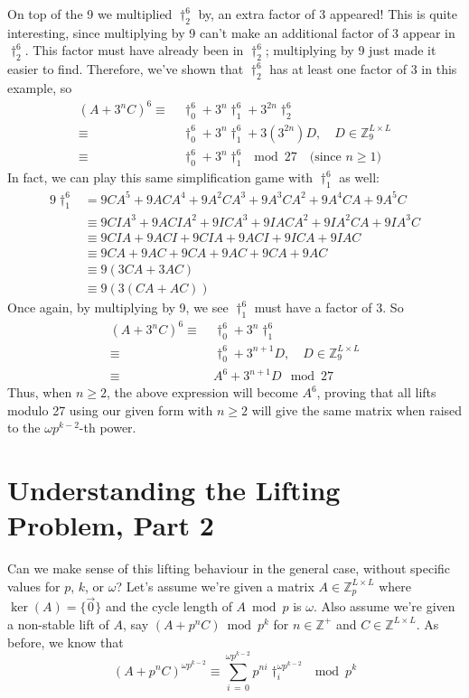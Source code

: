 \documentclass[a4paper, 12pt, reqno]{amsart}
\begin{document}
		On top of the 9 we multiplied $\dag_2^6$ by, an extra factor of 3 appeared! This is quite interesting, since multiplying by 9 can't make an additional factor of 3
		appear in $\dag_2^6$. This factor must have already been in $\dag_2^6$; multiplying by 9 just made it easier to find. Therefore, we've shown that $\dag_2^6$ has at
		least one factor of 3 in this example, so
		\begin{align*}
			(A + 3^nC)^6 \equiv & \ \dag_0^6 + 3^n\dag_1^6 + 3^{2n}\dag_2^6                                   \\
			             \equiv & \ \dag_0^6 + 3^n\dag_1^6 + 3(3^{2n})D,\quad D \in \mathds{Z}_9^{L \times L} \\
						 \equiv & \ \dag_0^6 + 3^n\dag_1^6 \mod{27} \quad \text{(since } n \geq 1)
		\end{align*}
		In fact, we can play this same simplification game with $\dag_1^6$ as well:
		\begin{align*}
			9\dag_1^6 &      = 9CA^5  + 9ACA^4  + 9A^2CA^3 + 9A^3CA^2 + 9A^4CA  + 9A^5C  \\
			          & \equiv 9CIA^3 + 9ACIA^2 + 9ICA^3   + 9IACA^2  + 9IA^2CA + 9IA^3C \\
					  & \equiv 9CIA   + 9ACI    + 9CIA     + 9ACI     + 9ICA    + 9IAC   \\
					  & \equiv 9CA    + 9AC     + 9CA      + 9AC      + 9CA     + 9AC    \\
					  & \equiv 9(3CA + 3AC)                                              \\
					  & \equiv 9(3(CA + AC))
		\end{align*}
		Once again, by multiplying by 9, we see $\dag_1^6$ must have a factor of 3. So
		\begin{align*}
			(A + 3^nC)^6 \equiv & \ \dag_0^6 + 3^n\dag_1^6                                    \\
			             \equiv & \ \dag_0^6 + 3^{n+1}D,\quad D \in \mathds{Z}_9^{L \times L} \\
						 \equiv & \ A^6 + 3^{n+1}D \mod{27}
		\end{align*}
		Thus, when $n \geq 2$, the above expression will become $A^6$, proving that all lifts modulo 27 using our given form with $n \geq 2$ will give the same matrix when 
		raised to the $\omega p^{k-2}$-th power.

	\section{Understanding the Lifting Problem, Part 2}
		\label{sec:understanding2}
		Can we make sense of this lifting behaviour in the general case, without specific values for $p$, $k$, or $\omega$? Let's assume we're given a matrix 
		$A \in \mathds{Z}_p^{L \times L}$ where $\ker(A) = \{\vec{0}\}$ and the cycle length of $A \bmod{p}$ is $\omega$. Also assume we're given a non-stable lift of $A$, 
		say $(A + p^nC) \bmod{p^k}$ for $n \in \mathds{Z}^+$ and $C \in \mathds{Z}^{L \times L}$. As before, we know that
		\[
			(A + p^nC)^{\omega p^{k-2}} \equiv \sum_{i\,=\,0}^{\omega p^{k-2}} p^{ni} \dag_i^{\omega p^{k-2}} \mod{p^k}
		\]
		
\end{document}

